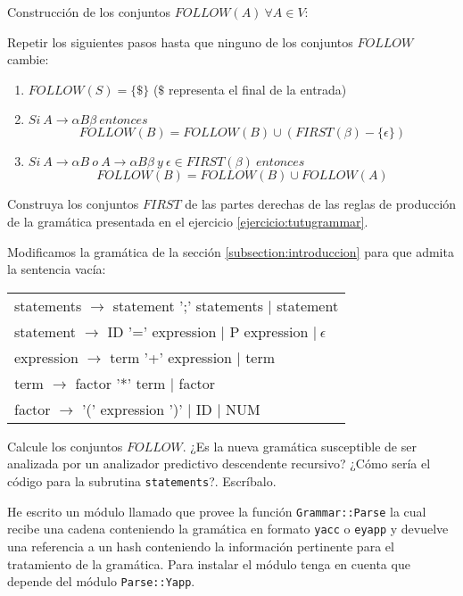 \begin{algorithm} Construcción de los conjuntos $FOLLOW(A)\ \forall A \in V$: 

Repetir los siguientes pasos hasta que ninguno de los conjuntos $FOLLOW$ cambie:
\begin{enumerate} 
\item 
$FOLLOW(S) = \{\$\} $  ($\$$ representa el final de la entrada)
\item
$Si\ A \rightarrow \alpha B \beta\ entonces$
\[ FOLLOW(B) =  FOLLOW(B) \cup (FIRST(\beta) - \{\epsilon\})\]
\item
$Si\ A \rightarrow \alpha B\ o\ A \rightarrow \alpha B \beta\ y\ \epsilon \in FIRST(\beta)\  entonces$
\[ FOLLOW(B) = FOLLOW(B) \cup FOLLOW(A)\]
\end{enumerate}
\end{algorithm}

Construya los conjuntos $FIRST$ de las partes derechas de las reglas de 
producción de la gramática presentada en el ejercicio \ref{ejercicio:tutugrammar}.

Modificamos la gramática de la sección 
\ref{subsection:introduccion}
para que admita la sentencia vacía:

\vspace{0.25cm}
\begin{tabular}{l}
statements   $\rightarrow$ statement  ';'  statements        $|$ statement\\
statement    $\rightarrow$ ID '=' expression                 $|$ P  expression $|\ \epsilon$\\
expression   $\rightarrow$ term '+' expression               $|$ term\\
term         $\rightarrow$ factor '*' term                   $|$ factor\\
factor       $\rightarrow$ '(' expression ')' $|$ ID $|$ NUM
\end{tabular}
\vspace{0.25cm}

Calcule los conjuntos $FOLLOW$. ¿Es la nueva gramática susceptible
de ser analizada por un analizador predictivo descendente recursivo?
¿Cómo sería el código para la subrutina \verb|statements|?. Escríbalo.

\label{practica:firstandfollow}
He escrito un módulo llamado 
que provee la función
\verb|Grammar::Parse| la cual recibe una cadena conteniendo la
gramática en formato \verb|yacc| o \verb|eyapp| y devuelve una referencia a un
hash conteniendo la información pertinente para el tratamiento de 
la gramática. 
Para instalar el módulo tenga en cuenta que depende del módulo \verb|Parse::Yapp|.

